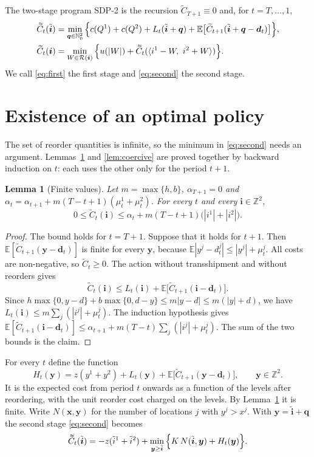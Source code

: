 \documentclass[11pt]{article}
\DeclareRobustCommand{\dbtilde}[1]{\accentset{\approx}{#1}}
\renewcommand{\vec}[1]{\boldsymbol{#1}}
\newcommand{\E}{\mathbb{E}}
\newcommand{\Z}{\mathbb{Z}}
\newcommand{\N}{\mathbb{N}_0}
\newcommand{\R}{\mathcal{R}}
\newcommand{\Ct}{\widetilde{C}}
\newcommand{\Cq}{\dbtilde{C}}
\newtheorem{lemma}{Lemma}
\theoremstyle{definition}
\begin{document}
The two-stage program SDP-2 is the recursion $\Ct_{T+1}\equiv 0$ and, for $t=T,\ldots,1$,
\begin{align}
\Cq_t(\tilde{\vec{i}})&=\min_{\vec{q}\in\N^2}\Big\{c(Q^1)+c(Q^2)+L_t(\tilde{\vec{i}}+\vec{q})+\E\big[\Ct_{t+1}(\tilde{\vec{i}}+\vec{q}-\vec{d}_t)\big]\Big\},\label{eq:second}\\
\Ct_t(\vec{i})&=\min_{W\in\R(\vec{i})}\Big\{u(|W|)+\Cq_t(\langle i^1-W,\ i^2+W\rangle)\Big\}.\label{eq:first}
\end{align}
We call \eqref{eq:first} the first stage and \eqref{eq:second} the second stage.

\section{Existence of an optimal policy}\label{sec:existence}

The set of reorder quantities is infinite, so the minimum in \eqref{eq:second} needs an argument. Lemmas~\ref{lem:bound} and \ref{lem:coercive} are proved together by backward induction on $t$: each uses the other only for the period $t+1$.

\begin{lemma}[Finite values]\label{lem:bound}
Let $m=\max\{h,b\}$, $\alpha_{T+1}=0$ and $\alpha_t=\alpha_{t+1}+m(T-t+1)(\mu^1_t+\mu^2_t)$. For every $t$ and every $\vec{i}\in\Z^2$,
\[
0\le \Ct_t(\vec{i})\le \alpha_t+m(T-t+1)\big(|i^1|+|i^2|\big).
\]
\end{lemma}

\begin{proof}
The bound holds for $t=T+1$. Suppose that it holds for $t+1$. Then $\E[\Ct_{t+1}(\vec{y}-\vec{d}_t)]$ is finite for every $\vec{y}$, because $\E|y^j-d^j_t|\le |y^j|+\mu^j_t$. All costs are non-negative, so $\Ct_t\ge 0$. The action without transshipment and without reorders gives
\[
\Ct_t(\vec{i})\le L_t(\vec{i})+\E\big[\Ct_{t+1}(\vec{i}-\vec{d}_t)\big].
\]
Since $h\max\{0,y-d\}+b\max\{0,d-y\}\le m|y-d|\le m(|y|+d)$, we have $L_t(\vec{i})\le m\sum_j(|i^j|+\mu^j_t)$. The induction hypothesis gives $\E[\Ct_{t+1}(\vec{i}-\vec{d}_t)]\le\alpha_{t+1}+m(T-t)\sum_j(|i^j|+\mu^j_t)$. The sum of the two bounds is the claim.
\end{proof}

For every $t$ define the function
\begin{equation}\label{eq:H}
H_t(\vec{y})=z(y^1+y^2)+L_t(\vec{y})+\E\big[\Ct_{t+1}(\vec{y}-\vec{d}_t)\big],\qquad \vec{y}\in\Z^2 .
\end{equation}
It is the expected cost from period $t$ onwards as a function of the levels after reordering, with the unit reorder cost charged on the levels. By Lemma~\ref{lem:bound} it is finite. Write $N(\vec{x},\vec{y})$ for the number of locations $j$ with $y^j>x^j$. With $\vec{y}=\tilde{\vec{i}}+\vec{q}$ the second stage \eqref{eq:second} becomes
\begin{equation}\label{eq:secondH}
\Cq_t(\tilde{\vec{i}})=-z(\tilde{i}^1+\tilde{i}^2)+\min_{\vec{y}\ge\tilde{\vec{i}}}\Big\{K\,N(\tilde{\vec{i}},\vec{y})+H_t(\vec{y})\Big\}.
\end{equation}
\end{document}
